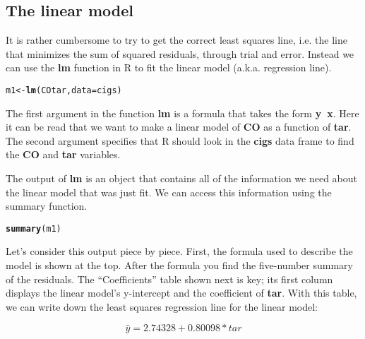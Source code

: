 \documentclass{article}\usepackage[]{graphicx}\usepackage[]{color}
\makeatletter
\newcommand{\hlopt}[1]{\textcolor[rgb]{0,0,0}{#1}}%
\newcommand{\hlstd}[1]{\textcolor[rgb]{0.345,0.345,0.345}{#1}}%
\newcommand{\hlkwb}[1]{\textcolor[rgb]{0.69,0.353,0.396}{#1}}%
\newcommand{\hlkwc}[1]{\textcolor[rgb]{0.333,0.667,0.333}{#1}}%
\newcommand{\hlkwd}[1]{\textcolor[rgb]{0.737,0.353,0.396}{\textbf{#1}}}%
\newenvironment{kframe}{%
 \def\at@end@of@kframe{}%
 \ifinner\ifhmode%
  \def\at@end@of@kframe{\end{minipage}}%
  \begin{minipage}{\columnwidth}%
 \fi\fi%
 \def\FrameCommand##1{\hskip\@totalleftmargin \hskip-\fboxsep
 \colorbox{shadecolor}{##1}\hskip-\fboxsep
     \hskip-\linewidth \hskip-\@totalleftmargin \hskip\columnwidth}%
 \MakeFramed {\advance\hsize-\width
   \@totalleftmargin\z@ \linewidth\hsize
   \@setminipage}}%
 {\par\unskip\endMakeFramed%
 \at@end@of@kframe}
\newenvironment{knitrout}{}{} %
\makeatother
\begin{document}
\subsection*{The linear model}

It is rather cumbersome to try to get the correct least squares line, i.e. the line that minimizes the sum of squared residuals, through trial and error. Instead we can use the \hlkwd{lm} function in R to fit the linear model (a.k.a. regression line).

\begin{knitrout}
\color{fgcolor}\begin{kframe}
\begin{alltt}
\hlstd{m1} \hlkwb{<-} \hlkwd{lm}\hlstd{(CO} \hlopt{\mytilde} \hlstd{tar,} \hlkwc{data} \hlstd{= cigs)}
\end{alltt}
\end{kframe}
\end{knitrout}

The first argument in the function \hlkwd{lm} is a formula that takes the form \hlkwd{y}\hlkwd{\texttildelow~}\hlkwd{x}.  Here it can be read that we want to make a linear model of \hlkwd{CO} as a function of \hlkwd{tar}.  The second argument specifies that R should look in the \hlkwd{cigs} data frame to find the \hlkwd{CO} and \hlkwd{tar} variables.

The output of \hlkwd{lm} is an object that contains all of the information we need about the linear model that was just fit.  We can access this information using the summary function.

\begin{knitrout}
\color{fgcolor}\begin{kframe}
\begin{alltt}
\hlkwd{summary}\hlstd{(m1)}
\end{alltt}
\end{kframe}
\end{knitrout}

Let's consider this output piece by piece.  First, the formula used to describe the model is shown at the top. After the formula you find the five-number summary of the residuals. The ``Coefficients'' table shown next is key; its first column displays the linear model's y-intercept and the coefficient of \hlkwd{tar}. With this table, we can write down the least squares regression line for the linear model:

\[ \hat{y} = 2.74328 + 0.80098 * tar \]
\end{document}
